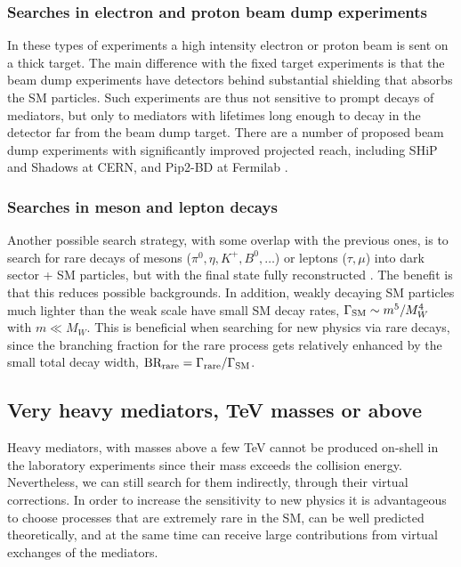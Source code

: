 \subsubsection{Searches in electron and proton beam dump experiments}  
In these types of experiments a high intensity electron or proton beam is sent on a thick target. The main difference with the fixed target experiments is that the beam dump experiments have detectors behind substantial shielding that absorbs the SM particles. Such experiments are thus not sensitive to prompt decays of mediators, but only to mediators with lifetimes long enough to decay in the detector far from the beam dump target. 
There are a number of proposed beam dump experiments with significantly improved projected reach, including {\sc SHiP} 
and {\sc Shadows} at CERN, and {\sc Pip2-BD} at Fermilab \cite{beam:dump}. 


\subsubsection{Searches in meson and lepton decays} 
Another possible search strategy, with some overlap with the previous ones, is to search for rare decays of mesons ($\pi^0, \eta, K^+, B^0,\ldots$) or leptons ($\tau, \mu$) into dark sector + SM particles, but with the final state fully reconstructed \cite{meson:decays}. The benefit is that this reduces possible backgrounds. In addition, weakly decaying SM particles much lighter than the weak scale have small SM decay rates, 
$\Gamma_{\rm SM}\sim  m^5/M_W^4$ with $m\ll M_W$. This is beneficial when searching for new physics via rare decays, 
since the branching fraction for the rare process gets relatively enhanced by the small total decay width, $\hbox{BR}_{\rm rare}=\Gamma_{\rm rare}/\Gamma_{\rm SM}$.


\subsection{Very heavy mediators, TeV masses or above}
Heavy mediators, with masses above a few TeV cannot be produced on-shell in the laboratory experiments since their mass exceeds the collision energy. Nevertheless, we can still search for them indirectly, through their virtual corrections. In order to increase the sensitivity to new physics it is advantageous to choose processes that are extremely rare in the SM, can be well predicted theoretically, and at the same time can receive large contributions from virtual exchanges of the mediators. 

